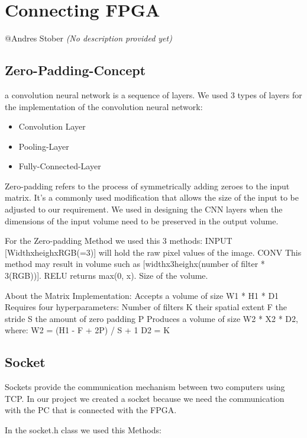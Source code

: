 \documentclass[parskip=full]{scrartcl}
\begin{document}
	
\pagebreak

\section{Connecting FPGA} \label{Connecting FPGA}
	@Andres Stober \textit{(No description provided yet)}
\subsection{Zero-Padding-Concept}

a convolution neural network is a sequence of layers. We used 3 types of layers for the implementation of the convolution neural network:

\begin {itemize}
	\item Convolution Layer
	\item Pooling-Layer
	\item Fully-Connected-Layer
\end{itemize}

Zero-padding refers to the process of symmetrically adding zeroes to the input matrix. 
It's a commonly used modification that allows the size of the input to be adjusted to our requirement. We used in designing the CNN layers when the dimensions of the input volume need to be preserved in the output volume.

For the Zero-padding Method we used this 3 methods:
INPUT [WidthxheighxRGB(=3)] will hold the raw pixel values of the image.
CONV This method may result in volume such as [widthx3heighx(number of filter * 3(RGB))].
RELU returns max(0, x). Size of the volume.
    
About the Matrix Implementation:
Accepts a volume of size W1 * H1 * D1
Requires four hyperparameters: 
Number of filters K
their spatial extent F
the stride S
the amount of zero padding P
Produces a volume of size W2 * X2 * D2, where:
W2 = (H1 - F + 2P) / S + 1
D2 = K

\pagebreak

\subsection{Socket}

Sockets provide the communication mechanism between two computers using TCP. In our project we created a socket because we need the communication with the PC that is connected with the FPGA. 

In the socket.h class we used this Methods:
\end{document}

